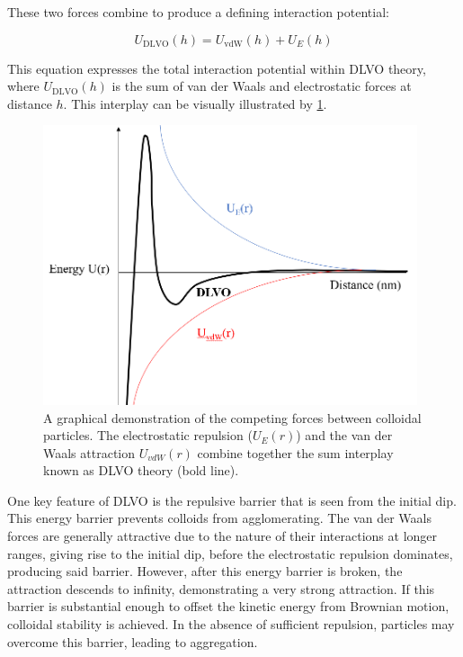 These two forces combine to produce a defining interaction potential:

\begin{equation}
U_{\text{DLVO}}(h) = U_{\text{vdW}}(h) + U_{E}(h)
\end{equation}

This equation expresses the total interaction potential within DLVO theory, where \( U_{\text{DLVO}}(h) \) is the sum of van der Waals and electrostatic forces at distance \( h \). This interplay can be visually illustrated by \ref{fig:DLVO}.


\begin{figure}[h]     %
        \begin{center}
          \includegraphics[width=110mm]{chapter1/DLVO.PNG}
\end{center}
\caption{A graphical demonstration of the competing forces between colloidal particles. The electrostatic repulsion ($U_E(r)$) and the van der Waals attraction $U_{vdW}(r)$ combine together the sum interplay known as DLVO theory (bold line).}
\label{fig:DLVO}                 %
\end{figure}

One key feature of DLVO is the repulsive barrier that is seen from the initial dip. This energy barrier prevents colloids from agglomerating. The van der Waals forces are generally attractive due to the nature of their interactions at longer ranges, giving rise to the initial dip, before the electrostatic repulsion dominates, producing said barrier. However, after this energy barrier is broken, the attraction descends to infinity, demonstrating a very strong attraction. If this barrier is substantial enough to offset the kinetic energy from Brownian motion, colloidal stability is achieved. In the absence of sufficient repulsion, particles may overcome this barrier, leading to aggregation.

